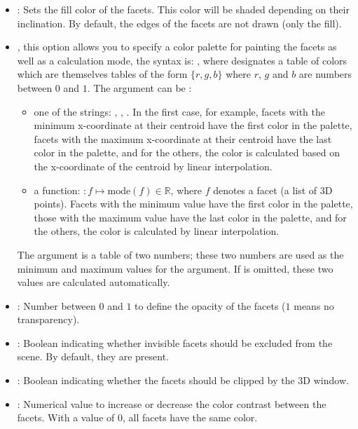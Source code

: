 \begin{itemize}
    \item {}: Sets the fill color of the facets. This color will be shaded depending on their inclination. By default, the edges of the facets are not drawn (only the fill).

     \item {}, this option allows you to specify a color palette for painting the facets as well as a calculation mode, the syntax is: , where  designates a table of colors which are themselves tables of the form $\{r,g,b\}$ where $r$, $g$ and $b$ are numbers between $0$ and $1$. The  argument can be :
        \begin{itemize}
            \item one of the strings: , , . In the first case, for example, facets with the minimum x-coordinate at their centroid have the first color in the palette, facets with the maximum x-coordinate at their centroid have the last color in the palette, and for the others, the color is calculated based on the x-coordinate of the centroid by linear interpolation.
            
            \item a function: $\colon f \mapsto \mathrm{mode}(f)\in\mathbb R$, where $f$ denotes a facet (a list of 3D points). Facets with the minimum value have the first color in the palette, those with the maximum value have the last color in the palette, and for the others, the color is calculated by linear interpolation.
        \end{itemize}
        The  argument is a table of two numbers; these two numbers are used as the minimum and maximum values ​​for the  argument. If  is omitted, these two values ​​are calculated automatically.
     \item {}: Number between $0$ and $1$ to define the opacity of the facets ($1$ means no transparency).

    \item {}: Boolean indicating whether invisible facets should be excluded from the scene. By default, they are present.

    \item {}: Boolean indicating whether the facets should be clipped by the 3D window.

    \item {}: Numerical value to increase or decrease the color contrast between the facets. With a value of $0$, all facets have the same color.


\end{itemize}
